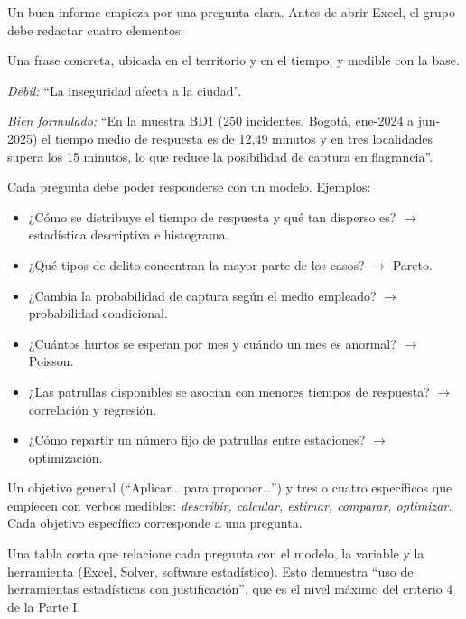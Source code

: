 Un buen informe empieza por una pregunta clara. Antes de abrir Excel, el grupo debe
redactar cuatro elementos:

\begin{cajaPaso}
Una frase concreta, ubicada en el territorio y en el tiempo, y medible con la base.
\par\smallskip
\textit{Débil:} ``La inseguridad afecta a la ciudad''.\par
\textit{Bien formulado:} ``En la muestra BD1 (250 incidentes, Bogotá, ene-2024 a
jun-2025) el tiempo medio de respuesta es de 12,49 minutos y en tres localidades supera
los 15 minutos, lo que reduce la posibilidad de captura en flagrancia''.
\end{cajaPaso}

\begin{cajaPaso}
Cada pregunta debe poder responderse con un modelo. Ejemplos:
\begin{itemize}[leftmargin=1.4em,itemsep=1pt]
\item ¿Cómo se distribuye el tiempo de respuesta y qué tan disperso es? $\rightarrow$ estadística descriptiva e histograma.
\item ¿Qué tipos de delito concentran la mayor parte de los casos? $\rightarrow$ Pareto.
\item ¿Cambia la probabilidad de captura según el medio empleado? $\rightarrow$ probabilidad condicional.
\item ¿Cuántos hurtos se esperan por mes y cuándo un mes es anormal? $\rightarrow$ Poisson.
\item ¿Las patrullas disponibles se asocian con menores tiempos de respuesta? $\rightarrow$ correlación y regresión.
\item ¿Cómo repartir un número fijo de patrullas entre estaciones? $\rightarrow$ optimización.
\end{itemize}
\end{cajaPaso}

\begin{cajaPaso}
Un objetivo general (``Aplicar\ldots{} para proponer\ldots'') y tres o cuatro específicos
que empiecen con verbos medibles: \textit{describir, calcular, estimar, comparar,
optimizar}. Cada objetivo específico corresponde a una pregunta.
\end{cajaPaso}

\begin{cajaPaso}
Una tabla corta que relacione cada pregunta con el modelo, la variable y la herramienta
(Excel, Solver, software estadístico). Esto demuestra ``uso de herramientas estadísticas
con justificación'', que es el nivel máximo del criterio 4 de la Parte I.
\end{cajaPaso}

